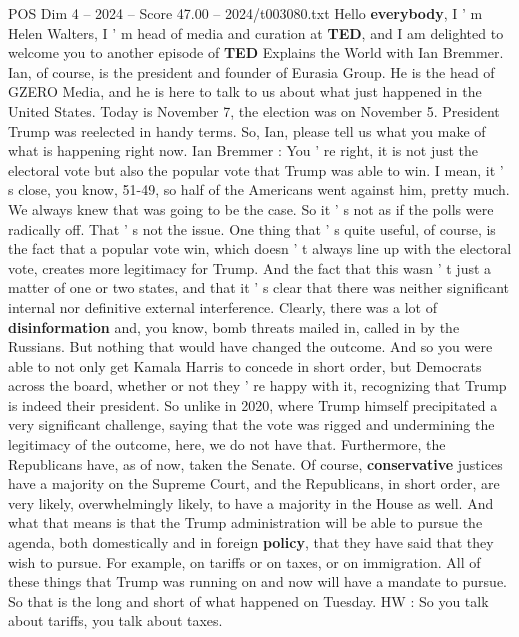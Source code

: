 \begin{textsample}{POS Dim 4 – 2024 – Score 47.00 – 2024/t003080.txt}  \label{ex:f4_pos_011}
Hello \textbf{everybody}, I ' m Helen Walters, I ' m head of media and curation at \textbf{TED}, and I am delighted to welcome you to another episode of \textbf{TED} Explains the World with Ian Bremmer.
Ian, of course, is the president and founder of Eurasia Group.
He is the head of GZERO Media, and he is here to talk to us about what just happened in the United States.
Today is November 7, the election was on November 5.
President Trump was reelected in handy terms.
So, Ian, please tell us what you make of what is happening right now.
Ian Bremmer : You ' re right, it is not just the electoral vote but also the popular vote that Trump was able to win.
I mean, it ' s close, you know, 51-49, so half of the Americans went against him, pretty much.
We always knew that was going to be the case.
So it ' s not as if the polls were radically off.
That ' s not the issue.
One thing that ' s quite useful, of course, is the fact that a popular vote win, which doesn ' t always line up with the electoral vote, creates more legitimacy for Trump.
And the fact that this wasn ' t just a matter of one or two states, and that it ' s clear that there was neither significant internal nor definitive external interference.
Clearly, there was a lot of \textbf{disinformation} and, you know, bomb threats mailed in, called in by the Russians.
But nothing that would have changed the outcome.
And so you were able to not only get Kamala Harris to concede in short order, but Democrats across the board, whether or not they ' re happy with it, recognizing that Trump is indeed their president.
So unlike in 2020, where Trump himself precipitated a very significant challenge, saying that the vote was rigged and undermining the legitimacy of the outcome, here, we do not have that.
Furthermore, the Republicans have, as of now, taken the Senate.
Of course, \textbf{conservative} justices have a majority on the Supreme Court, and the Republicans, in short order, are very likely, overwhelmingly likely, to have a majority in the House as well.
And what that means is that the Trump administration will be able to pursue the agenda, both domestically and in foreign \textbf{policy}, that they have said that they wish to pursue.
For example, on tariffs or on taxes, or on immigration.
All of these things that Trump was running on and now will have a mandate to pursue.
So that is the long and short of what happened on Tuesday.
HW : So you talk about tariffs, you talk about taxes.

\end{textsample}
